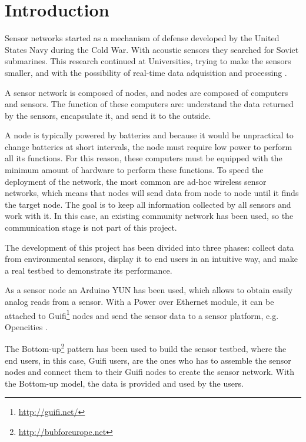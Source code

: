 \documentclass[12pt, a4paper,twoside]{tesi_upf}
\begin{document}
\mainmatter
\chapter{Introduction}
\label{Chapter1}
	
	Sensor networks started as a mechanism of defense developed by the United States Navy during the Cold War. With acoustic sensors they searched for Soviet submarines. This research continued at Universities, trying to make the sensors smaller, and with the possibility of real-time data adquisition and processing \cite{chong2003sensor}.
	
	A sensor network is composed of nodes, and nodes are composed of computers and sensors. The function of these computers are: understand the data returned by the sensors, encapsulate it, and send it to the outside.
	
	A node is typically powered by batteries and because it would be unpractical to change batteries at short intervals, the node must require low power to perform all its functions. For this reason, these computers must be equipped with the minimum amount of hardware to perform these functions.
	To speed the deployment of the network, the most common are ad-hoc wireless sensor networks, which means that nodes will send data from node to node until it finds the target node. The goal is to keep all information collected by all sensors and work with it.
	In this case, an existing community network has been used, so the communication stage is not part of this project.
	
  The development of this project has been divided into three phases: collect data from environmental sensors, display it to end users in an intuitive way, and make a real testbed to demonstrate its performance.
  
  As a sensor node an Arduino\cite{arduino} YUN has been used, which allows to obtain easily analog reads from a sensor. With a Power over Ethernet module, it can be attached to Guifi\footnote{\url{http://guifi.net/}} nodes and send the sensor data to a sensor platform, e.g. Opencities \cite{opencities}.

  The Bottom-up\footnote{\url{http://bubforeurope.net}} pattern has been used to build the sensor testbed, where the end users, in this case, Guifi users, are the ones who has to assemble the sensor nodes and connect them to their Guifi nodes to create the sensor network. With the Bottom-up model, the data is provided and used by the users.
\end{document}
